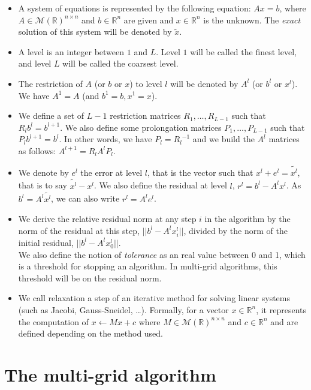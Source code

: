\documentclass[a4paper,10pt]{article}
\begin{document}
\begin{itemize}
 \item A system of equations is represented by the following equation: $Ax=b$, where $A \in \mathcal{M}(\mathbb{R})^{n\times n}$ and $b \in \mathcal{\mathbb{R}}^n$ are given and
 $x \in \mathbb{R}^n$ is the unknown. The \emph{exact} solution of this system will be denoted by $\widetilde{x}$.
 \item A level is an integer between $1$ and $L$. Level $1$ will be called the finest level, and level $L$ will be called the coarsest level.
 \item The restriction of $A$ (or $b$ or $x$) to level $l$ will be denoted by $A^l$ (or $b^l$ or $x^l$). We have $A^1 = A$ (and $b^1=b,x^1=x$).
 \item We define a set of $L-1$ restriction matrices $R_1,\dots,R_{L-1}$ such that $R_l b^l = b^{l+1}$. We also define some prolongation matrices $P_1,\dots,P_{L-1}$ such that $P_{l}b^{l+1} = b^l$.
 In other words, we have $P_l = {R_l}^{-1}$ and we build the $A^l$ matrices as follows: $A^{l+1} = R_l A^l P_l$.
 \item We denote by $e^l$ the error at level $l$, that is the vector such that $x^l + e^l = \widetilde{x^l}$, that is to say $\widetilde{x^l}-x^l$.
 We also define the residual at level $l$, $r^l = b^l - A^lx^l$. As $b^l = A^l\widetilde{x^l}$, we can also write $r^l = A^le^l$.
 \item We derive the relative residual norm at any step $i$ in the algorithm
 by the norm of the residual at this step, $||b^l - A^lx^l_i||$, divided by the norm of the initial residual, $|| b^l - A^lx^l_0||$.\\ We also define the notion of \emph{tolerance}
 as an real value between 0 and 1, which is a threshold for stopping an algorithm. In multi-grid algorithms, this threshold will be on the residual norm.
 \item We call relaxation a step of an iterative method for solving linear systems (such as Jacobi, Gauss-Sneidel, \dots). Formally, for a vector $x \in \mathbb{R}^n$, it represents the computation of
 $x \leftarrow Mx + c$ where $M \in \mathcal{M}(\mathbb{R})^{n\times n}$ and $c \in \mathcal{\mathbb{R}}^n$ and are defined depending on the method used.
\end{itemize}

\section{The multi-grid algorithm}
\end{document}

